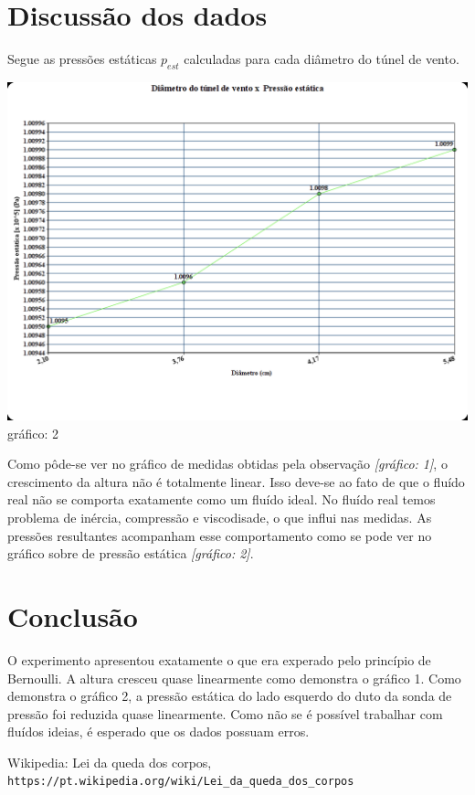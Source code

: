 \documentclass[a4paper]{article}
\begin{document}
\section{Discussão dos dados}
    Segue as pressões estáticas $p_{est}$ calculadas para cada diâmetro do túnel de vento.
        \begin{center}
              \includegraphics[width=\linewidth]{img/graphPression.png}
              \label{graph}{gráfico: 2}
        \end{center}

        Como pôde-se ver no gráfico de medidas obtidas pela observação \textit{[gráfico: 1]}, o crescimento da altura não é totalmente linear. Isso deve-se ao fato de que o fluído real não se comporta exatamente como um fluído ideal. No fluído real temos problema de inércia, compressão e viscodisade, o que influi nas medidas. As pressões resultantes acompanham esse comportamento como se pode ver no gráfico sobre de pressão estática \textit{[gráfico: 2]}.

\section{Conclusão}
O experimento apresentou exatamente o que era experado pelo princípio de Bernoulli. A altura cresceu quase linearmente como demonstra o gráfico 1. Como demonstra o gráfico 2, a pressão estática do lado esquerdo do duto da sonda de pressão foi reduzida quase linearmente. Como não se é possível trabalhar com fluídos ideias, é esperado que os dados possuam erros.

\begin{thebibliography}{1}

    Wikipedia: Lei da queda dos corpos,
    \\\texttt{https://pt.wikipedia.org/wiki/Lei\_da\_queda\_dos\_corpos}
\end{thebibliography}
\end{document}
